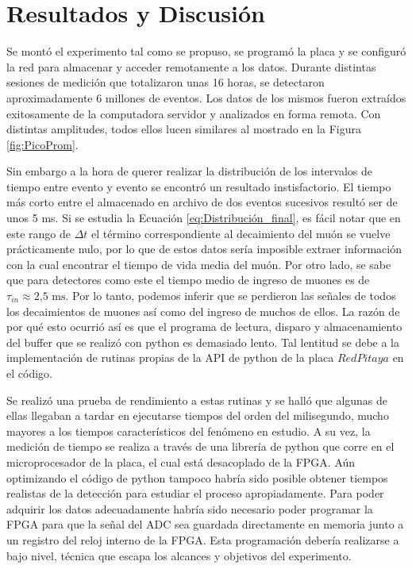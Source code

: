 \documentclass[twocolumn , reprint, a4paper, 12pt]{article}
\begin{document}
\section*{Resultados y Discusión}
Se montó el experimento tal como se propuso, se programó la placa y se configuró la red para almacenar y acceder remotamente a los datos.
Durante distintas sesiones de medición que totalizaron unas 16 horas, se detectaron aproximadamente 6 millones de eventos. Los datos de los mismos fueron 
extraídos exitosamente de la computadora servidor y analizados en forma remota. Con distintas amplitudes, todos ellos lucen similares al mostrado
en la Figura \ref{fig:PicoProm}.

Sin embargo a la hora de querer realizar la distribución de los intervalos de tiempo entre evento y evento se encontró un resultado instisfactorio.
El tiempo más corto entre el almacenado en archivo de dos eventos sucesivos resultó ser de unos 5 ms. Si se estudia la Ecuación \ref{eq:Distribución_final},
es fácil notar que en este rango de $\Delta t$ el término correspondiente al decaimiento del muón se vuelve prácticamente nulo, por lo que de
estos datos sería imposible extraer información con la cual encontrar el tiempo de vida media del muón. Por otro lado, se sabe que para detectores
como este el tiempo medio de ingreso de muones es de $\tau_{in} \approx \text{2,5 ms}$. \cite{Asorey} Por lo tanto, podemos inferir que se perdieron las señales
de todos los decaimientos de muones así como del ingreso de muchos de ellos. La razón de por qué esto ocurrió así es que el programa de 
lectura, disparo y almacenamiento del buffer que se realizó con python es demasiado lento. Tal lentitud se debe a la implementación de rutinas propias de la 
API de python de la placa $RedPitaya$ en el código. 

Se realizó una prueba de rendimiento a estas rutinas y se halló que algunas de ellas llegaban
a tardar en ejecutarse tiempos del orden del milisegundo, mucho mayores a los tiempos característicos del fenómeno en estudio. A su vez, la medición
de tiempo se realiza a través de una librería de python que corre en el microprocesador de la placa, el cual está desacoplado de la FPGA. 
Aún optimizando el código de python tampoco habría sido posible obtener tiempos realistas de la detección para estudiar el proceso apropiadamente.
Para poder adquirir los datos adecuadamente habría sido necesario poder programar la FPGA para que la señal del ADC sea guardada directamente
en memoria junto a un registro del reloj interno de la FPGA. Esta programación debería realizarse a bajo nivel, técnica que escapa los alcances y 
objetivos del experimento.
\end{document}
